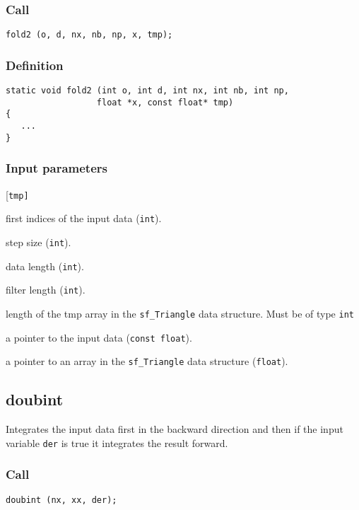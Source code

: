 \subsubsection*{Call}
\begin{verbatim}fold2 (o, d, nx, nb, np, x, tmp);\end{verbatim}

\subsubsection*{Definition}
\begin{verbatim}
static void fold2 (int o, int d, int nx, int nb, int np, 
                  float *x, const float* tmp)
{
   ...
}
\end{verbatim}

\subsubsection*{Input parameters}
\begin{desclist}{\tt }{\quad}[\tt tmp]
   \setlength\itemsep{0pt}
   \item[o]  first indices of the input data (\texttt{int}).  
   \item[d]  step size (\texttt{int}).
   \item[nx]	 data length (\texttt{int}).        
   \item[nb]	 filter length (\texttt{int}).        
   \item[np]  length of the tmp array in the \texttt{sf\_Triangle} data structure. Must be of type \texttt{int}
   \item[x]   a pointer to the input data (\texttt{const float}).  
   \item[tmp] a pointer to an array in the \texttt{sf\_Triangle} data structure (\texttt{float}).
\end{desclist}




\subsection{{doubint}}\label{sec:doubint}
Integrates the input data first in the backward direction and then if the input variable \texttt{der} is true it integrates the result forward.   

\subsubsection*{Call}
\begin{verbatim}doubint (nx, xx, der);\end{verbatim}


